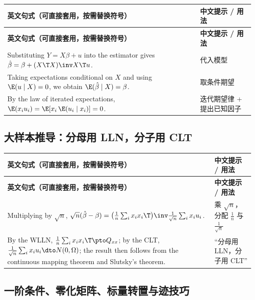 {\renewcommand{\arraystretch}{1.15}\begin{longtable}{@{}>{\raggedright\arraybackslash}p{11.4cm}>{\raggedright\arraybackslash\small}p{4.3cm}@{}}
\toprule
\textbf{英文句式（可直接套用，按需替换符号）} & \textbf{中文提示 / 用法}\\
\midrule
\endfirsthead
\toprule
\textbf{英文句式（可直接套用，按需替换符号）} & \textbf{中文提示 / 用法}\\
\midrule
\endhead
\bottomrule
\endlastfoot
Substituting $Y=X\beta+u$ into the estimator gives $\hat\beta=\beta+(X\T X)\inv X\T u$. & 代入模型\\
\addlinespace[2pt]
Taking expectations conditional on $X$ and using $\E(u\mid X)=0$, we obtain $\E(\hat\beta\mid X)=\beta$. & 取条件期望\\
\addlinespace[2pt]
By the law of iterated expectations, $\E(x_iu_i)=\E[x_i\,\E(u_i\mid x_i)]=0$. & 迭代期望律 + 提出已知因子\\
\end{longtable}}


\subsection{大样本推导：分母用 LLN，分子用 CLT}

{\renewcommand{\arraystretch}{1.15}\begin{longtable}{@{}>{\raggedright\arraybackslash}p{11.4cm}>{\raggedright\arraybackslash\small}p{4.3cm}@{}}
\toprule
\textbf{英文句式（可直接套用，按需替换符号）} & \textbf{中文提示 / 用法}\\
\midrule
\endfirsthead
\toprule
\textbf{英文句式（可直接套用，按需替换符号）} & \textbf{中文提示 / 用法}\\
\midrule
\endhead
\bottomrule
\endlastfoot
Multiplying by $\sqrt n$, $\sqrt n(\hat\beta-\beta)=\bigl(\frac1n\sum_i x_ix_i\T\bigr)\inv\frac{1}{\sqrt n}\sum_i x_iu_i$. & 乘 $\sqrt n$，分配 $\frac1n$ 与 $\frac{1}{\sqrt n}$\\
\addlinespace[2pt]
By the WLLN, $\frac1n\sum_i x_ix_i\T\pto Q_{xx}$; by the CLT, $\frac{1}{\sqrt n}\sum_i x_iu_i\dto N(0,\Omega)$; the result then follows from the continuous mapping theorem and Slutsky's theorem. & “分母用 LLN，分子用 CLT”\\
\end{longtable}}


\subsection{一阶条件、零化矩阵、标量转置与迹技巧}

